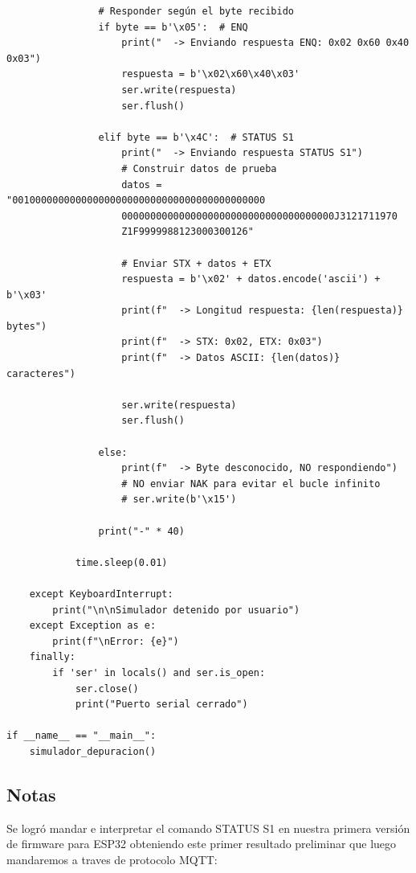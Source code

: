 \documentclass[12pt, a4paper]{article}
\begin{document}
\begin{verbatim}
                # Responder según el byte recibido
                if byte == b'\x05':  # ENQ
                    print("  -> Enviando respuesta ENQ: 0x02 0x60 0x40 0x03")
                    respuesta = b'\x02\x60\x40\x03'
                    ser.write(respuesta)
                    ser.flush()
                    
                elif byte == b'\x4C':  # STATUS S1
                    print("  -> Enviando respuesta STATUS S1")
                    # Construir datos de prueba
                    datos = "00100000000000000000000000000000000000000000
                    0000000000000000000000000000000000000J3121711970
                    Z1F9999988123000300126"
                    
                    # Enviar STX + datos + ETX
                    respuesta = b'\x02' + datos.encode('ascii') + b'\x03'
                    print(f"  -> Longitud respuesta: {len(respuesta)} bytes")
                    print(f"  -> STX: 0x02, ETX: 0x03")
                    print(f"  -> Datos ASCII: {len(datos)} caracteres")
                    
                    ser.write(respuesta)
                    ser.flush()
                    
                else:
                    print(f"  -> Byte desconocido, NO respondiendo")
                    # NO enviar NAK para evitar el bucle infinito
                    # ser.write(b'\x15')
                
                print("-" * 40)
            
            time.sleep(0.01)
            
    except KeyboardInterrupt:
        print("\n\nSimulador detenido por usuario")
    except Exception as e:
        print(f"\nError: {e}")
    finally:
        if 'ser' in locals() and ser.is_open:
            ser.close()
            print("Puerto serial cerrado")

if __name__ == "__main__":
    simulador_depuracion()
    \end{verbatim}

    \subsection*{Notas}

    Se logró mandar e interpretar el comando STATUS S1 en nuestra primera versión de firmware para ESP32 obteniendo este primer resultado preliminar que luego mandaremos a traves de protocolo MQTT:
\end{document}
